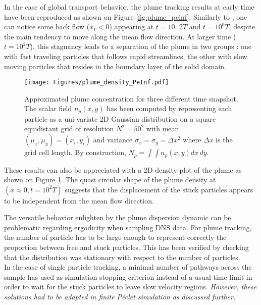 In the case of global transport behavior, the plume tracking results at early time have been reproduced as shown on Figure \ref{fig:plume_peinf}. 
Similarly to \cite{Meyer2016}, one can notice some back flow ($x_1<0$) appearing at $t=10^-2T$ and $t=10^0T$, despite the main tendency to move along the mean flow direction.  
At larger time ($t=10^2T$), this stagnancy leads to a separation of the plume in two groups : one with fast traveling particles that follows rapid streamlines, the other with slow moving particles that resides in the boundary layer of the solid domain.\\
\begin{figure}[h]
	\centering
	\texttt{[image: Figures/plume\_density\_PeInf.pdf]}
	\caption{Approximated plume concentration for three different time snapshot. The scalar field $n_p(x,y)$ has been computed by representing each particle as a uni-variate 2D Gaussian distribution on a square equidistant grid of resolution $N^2=50^2$ with mean $(\mu_x,\mu_y)=(x_i,y_i)$ and variance $\sigma_x = \sigma_y = \Delta x^2$ where $\Delta x$ is the grid cell length. By construction, $N_p = \int\int n_p(x,y) dx\, dy$.}
	\label{fig:plume_density_peinf}
\end{figure}
These results can also be appreciated with a 2D density plot of the plume as shown on Figure \ref{fig:plume_density_peinf}. 
The quasi circular shape of the plume density at $(x\approx 0, t=10^2 T)$ suggests that the displacement of the stuck particles appears to be independent from the mean flow direction.

The versatile behavior enlighten by the plume dispersion dynamic can be problematic regarding ergodicity when sampling DNS data.
For plume tracking, the number of particle has to be large enough to represent correctly the proportion between free and stuck particles.
This has been verified by checking that the distribution was stationary with respect to the number of particles.\\
In the case of single particle tracking, a minimal number of pathways across the sample has used as simulation stopping criterion instead of a usual time limit in order to wait for the stuck particles to leave slow velocity regions.
\textit{However, these solutions had to be adapted in finite Péclet simulation as discussed further. }

